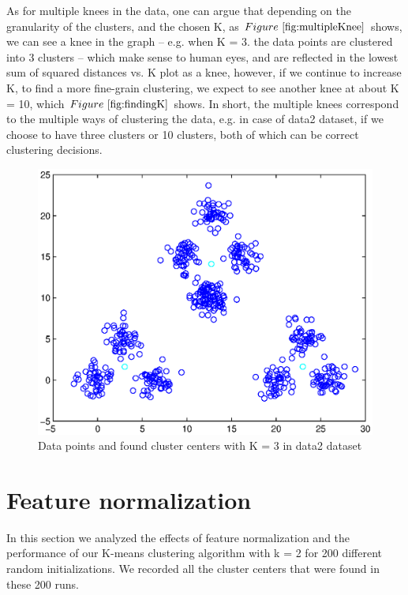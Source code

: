 \documentclass{article} %
\begin{document}
As for multiple knees in the data, one can argue that depending on the granularity of the clusters, and the chosen K, as $Figure~\ref{fig:multipleKnee}$ shows, we can see a knee in the graph -- e.g. when K = 3. the data points are clustered into 3 clusters -- which make sense to human eyes, and are reflected in the lowest sum of squared distances vs. K plot as a knee, however, if we continue to increase K, to find a more fine-grain clustering, we expect to see another knee at about K = 10, which $Figure~\ref{fig:findingK}$ shows. In short, the multiple knees correspond to the multiple ways of clustering the data, e.g. in case of data2 dataset, if we choose to have three clusters or 10 clusters, both of which can be correct clustering decisions. 

\begin{figure}[h]
\begin{center}
\includegraphics[width=13cm]{Fig/fig_multiple_knee.eps}
 \end{center}
\caption{\small{Data points and found cluster centers with K = 3 in data2 dataset}} 
\label{fig:multipleKnee}
\end{figure}


\section{Feature normalization}

In this section we analyzed the effects of feature normalization and the performance of our K-means clustering algorithm with k = 2 for 200 different random initializations. 
We recorded all the cluster centers that were found in these 200 runs.
\end{document}

